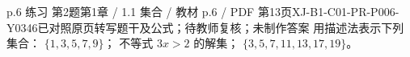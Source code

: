 \par\noindent\begin{minipage}{\linewidth}
\begin{bankitem}{p.6 练习 第2题}{第1章 / 1.1 集合 / 教材 p.6 / PDF 第13页}{XJ-B1-C01-PR-P006-Y0346}{已对照原页转写题干及公式；待教师复核；未制作答案}
用描述法表示下列集合：
$\{1,3,5,7,9\}$；
不等式 $3x>2$ 的解集；
$\{3,5,7,11,13,17,19\}$。
\end{bankitem}
\end{minipage}\par\medskip
